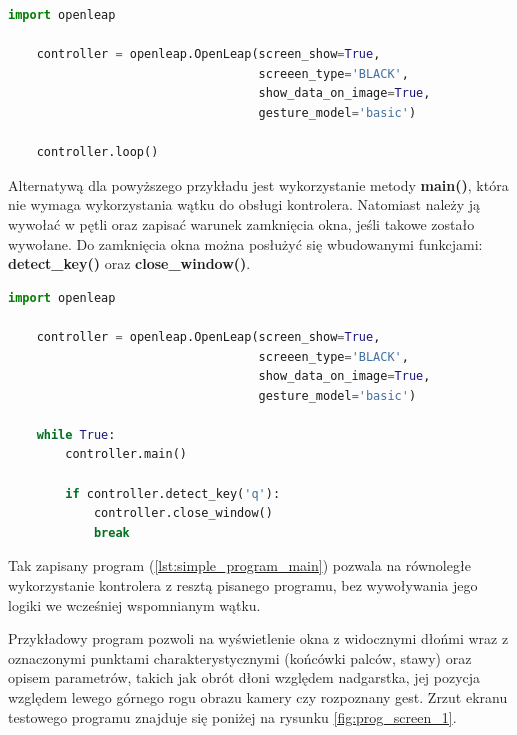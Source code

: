 \begin{lstlisting}[language=python, style=programming, label={lst:simple_program_loop}, caption={Program testowy}]
    import openleap

    controller = openleap.OpenLeap(screen_show=True, 
                                   screeen_type='BLACK', 
                                   show_data_on_image=True, 
                                   gesture_model='basic')
    
    controller.loop()
\end{lstlisting}


\quad Alternatywą dla powyższego przykładu jest wykorzystanie metody \textbf{main()}, która nie wymaga wykorzystania wątku do obsługi kontrolera. Natomiast należy ją wywołać w pętli oraz zapisać warunek zamknięcia okna, jeśli takowe zostało wywołane. Do zamknięcia okna można posłużyć się wbudowanymi funkcjami: \textbf{detect\_key()} oraz \textbf{close\_window()}.\newline

\newpage
\begin{lstlisting}[language=python, style=programming, label={lst:simple_program_main}, caption={Program testowy}]
    import openleap

    controller = openleap.OpenLeap(screen_show=True, 
                                   screeen_type='BLACK', 
                                   show_data_on_image=True, 
                                   gesture_model='basic')
    
    while True:
        controller.main()

        if controller.detect_key('q'):
            controller.close_window()
            break
\end{lstlisting}

\quad Tak zapisany program (\ref{lst:simple_program_main}) pozwala na równoległe wykorzystanie kontrolera z resztą pisanego programu, bez wywoływania jego logiki we wcześniej wspomnianym wątku. 

\quad Przykładowy program pozwoli na wyświetlenie okna z widocznymi dłońmi wraz z oznaczonymi punktami charakterystycznymi (końcówki palców, stawy) oraz opisem parametrów, takich jak obrót dłoni względem nadgarstka, jej pozycja względem lewego górnego rogu obrazu kamery czy rozpoznany gest. Zrzut ekranu testowego programu znajduje się poniżej na rysunku \ref{fig:prog_screen_1}. 

